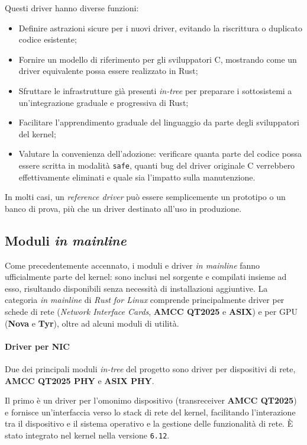 \noindent Questi driver hanno diverse funzioni:
\begin{itemize}
    \item Definire astrazioni sicure per i nuovi driver, evitando la riscrittura o duplicato codice esistente;
    \item Fornire un modello di riferimento per gli sviluppatori C, mostrando come un driver equivalente possa essere realizzato in Rust;
    \item Sfruttare le infrastrutture già presenti \textit{in-tree} per preparare i sottosistemi a un'integrazione graduale e progressiva di Rust;
    \item Facilitare l'apprendimento graduale del linguaggio da parte degli sviluppatori del kernel;
    \item Valutare la convenienza dell'adozione: verificare quanta parte del codice possa essere scritta in modalità \texttt{safe}, quanti bug del driver originale C verrebbero effettivamente eliminati e quale sia l'impatto sulla manutenzione.
\end{itemize}
In molti casi, un \textit{reference driver} può essere semplicemente un prototipo o un banco di prova, più che un driver destinato all'uso in produzione.

\subsection{Moduli \textit{in mainline}}
Come precedentemente accennato, i moduli e driver \textit{in mainline} fanno ufficialmente parte del kernel: sono inclusi nel 
sorgente e compilati insieme ad esso, risultando disponibili senza necessità di installazioni aggiuntive.
La categoria \textit{in mainline} di \textit{Rust for Linux} comprende principalmente driver per schede di rete (\textit{Network Interface Cards}, \textbf{AMCC QT2025} e \textbf{ASIX}) e per GPU (\textbf{Nova} e \textbf{Tyr}), oltre ad 
alcuni moduli di utilità.

\paragraph{Driver per NIC}
Due dei principali moduli \textit{in-tree} del progetto sono driver per dispositivi di rete, \textbf{AMCC QT2025 PHY} e \textbf{ASIX PHY}.\ 

Il primo è un driver per l'omonimo dispositivo (transreceiver \textbf{AMCC QT2025}) e fornisce un'interfaccia verso lo 
stack di rete del kernel, facilitando l'interazione tra 
il dispositivo e il sistema operativo e la gestione delle funzionalità di rete.
È stato integrato nel kernel nella versione \texttt{6.12}.

